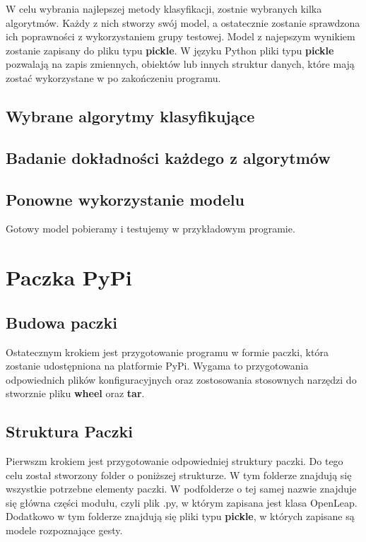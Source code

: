     \quad W celu wybrania najlepszej metody klasyfikacji, zostnie wybranych kilka algorytmów. Każdy z nich stworzy swój model, a ostatecznie zostanie sprawdzona ich poprawności z wykorzystaniem grupy testowej. Model z najepszym wynikiem zostanie zapisany do pliku typu \textbf{pickle}. W języku Python pliki typu \textbf{pickle} pozwalają na zapis zmiennych, obiektów lub innych struktur danych, które mają zostać wykorzystane w po zakończeniu programu. 

    \subsection{Wybrane algorytmy klasyfikujące}

    \subsection{Badanie dokładności każdego z algorytmów}
    
    \subsection{Ponowne wykorzystanie modelu}
    
    \quad Gotowy model pobieramy i testujemy w przykładowym programie. 
    
    \section{Paczka PyPi}

    \subsection{Budowa paczki}
    
    \quad Ostatecznym krokiem jest przygotowanie programu w formie paczki, która zostanie udostępniona na platformie PyPi. Wygama to przygotowania odpowiednich plików konfiguracyjnych oraz zostosowania stosownych narzędzi do stworznie pliku \textbf{wheel} oraz \textbf{tar}. 
    
    \subsection{Struktura Paczki}
    \quad Pierwszm krokiem jest przygotowanie odpowiedniej struktury paczki. Do tego celu został stworzony folder o poniższej strukturze. W tym folderze znajdują się wszystkie potrzebne elementy paczki. W podfolderze o tej samej nazwie znajduje się główna części modułu, czyli plik .py, w którym zapisana jest klasa OpenLeap. Dodatkowo w tym folderze znajdują się pliki typu \textbf{pickle}, w których zapisane są modele rozpoznające gesty.
    
